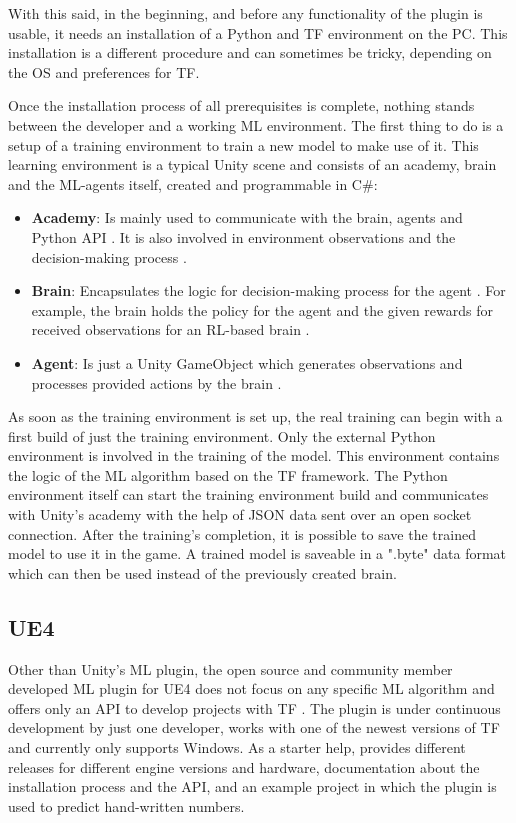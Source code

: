 \documentclass[MGS,Master,english]{twbook}%
\begin{document}
With this said, in the beginning, and before any functionality of the plugin is usable, it needs an installation of a Python and \ac{TF} environment on the \ac{PC}. This installation is a different procedure and can sometimes be tricky, depending on the \ac{OS} and preferences for \ac{TF}.

Once the installation process of all prerequisites is complete, nothing stands between the developer and a working \ac{ML} environment. The first thing to do is a setup of a training environment to train a new model to make use of it. This learning environment is a typical Unity scene and consists of an academy, brain and the \ac{ML}-agents itself, created and programmable in C\#:
\begin{itemize}
	\item \textbf{Academy}: Is mainly used to communicate with the brain, agents and Python \ac{API} \cite{unity::mlGithub}. It is also involved in environment observations and the decision-making process \cite{unity::mlGithub}. 
	\item \textbf{Brain}: Encapsulates the logic for decision-making process for the agent \cite{unity::mlGithub}. For example, the brain holds the policy for the agent and the given rewards for received observations for an \ac{RL}-based brain \cite{unity::mlGithub}.
	\item \textbf{Agent}: Is just a Unity GameObject which generates observations and processes provided actions by the brain \cite{unity::mlGithub}.
\end{itemize}  
As soon as the training environment is set up, the real training can begin with a first build of just the training environment. Only the external Python environment is involved in the training of the model. This environment contains the logic of the \ac{ML} algorithm based on the \ac{TF} framework. The Python environment itself can start the training environment build and communicates with Unity’s academy with the help of \ac{JSON} data sent over an open socket connection. After the training's completion, it is possible to save the trained model to use it in the game. A trained model is saveable in a ".byte" data format which can then be used instead of the previously created brain.

\subsection{\acl{UE4}}
Other than Unity’s \ac{ML} plugin, the open source and community member developed \ac{ML} plugin for \ac{UE4} does not focus on any specific \ac{ML} algorithm and offers only an \ac{API} to develop projects with \ac{TF} \cite{ue4::tensorFlowPlugin}. The plugin is under continuous development by just one developer, works with one of the newest versions of \ac{TF} and currently only supports Windows. As a starter help, \citep{ue4::tensorFlowPlugin} provides different releases for different engine versions and hardware, documentation about the installation process and the \ac{API}, and an example project in which the plugin is used to predict hand-written numbers.
\end{document}

